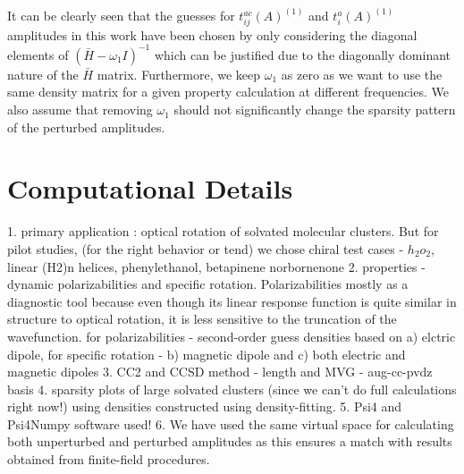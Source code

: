 \\
It can be clearly seen that the guesses for $t^{ac}_{ij}(A)^{(1)}$ and 
$t^{a}_{i}(A)^{(1)}$ amplitudes in this work have been chosen by 
only considering the diagonal elements of $(\bar{H} -\omega_1 I)^{-1}$
which can be justified due to the diagonally dominant nature of the
$\bar{H}$ matrix. Furthermore, we keep $\omega_1$ as zero as we 
want to use the same density matrix for a given property calculation at different
frequencies. We also assume that removing $\omega_1$ should not significantly change the 
sparsity pattern of the perturbed amplitudes. 
\section{Computational Details}
1. primary application : optical rotation of solvated molecular clusters. But for pilot studies,
   (for the right behavior or tend)
   we chose chiral test cases - $h_2o_2$, linear (H2)n helices, phenylethanol, betapinene
   norbornenone 
2. properties - dynamic polarizabilities 
   and specific rotation. Polarizabilities mostly as a diagnostic tool
   because even though its linear response function is quite similar in structure
   to optical rotation, it is less sensitive to the truncation of the wavefunction.
  for polarizabilities - second-order guess densities based on a) elctric dipole,
  for specific rotation - b) magnetic dipole and c) both electric and magnetic dipoles
3. CC2 and CCSD method  - length and MVG - aug-cc-pvdz basis
4. sparsity plots of large solvated clusters (since we can't do full calculations 
	right now!) using densities constructed using density-fitting.
5. Psi4 and Psi4Numpy software used!
6. We have used the same virtual space for calculating both unperturbed and 
perturbed amplitudes as this ensures a match with results obtained 
from finite-field procedures.

